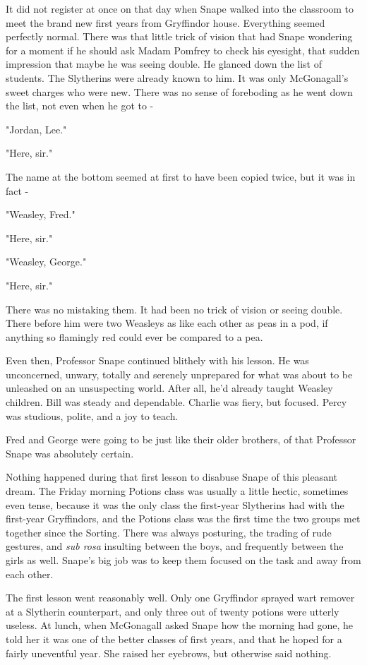 \documentclass[a4paper,11pt]{article}
\begin{document}
It did not register at once on that day when Snape walked into the classroom to meet the brand new first years from Gryffindor house. Everything seemed perfectly normal. There was that little trick of vision that had Snape wondering for a moment if he should ask Madam Pomfrey to check his eyesight, that sudden impression that maybe he was seeing double. He glanced down the list of students. The Slytherins were already known to him. It was only McGonagall's sweet charges who were new. There was no sense of foreboding as he went down the list, not even when he got to -

"Jordan, Lee."

"Here, sir."

The name at the bottom seemed at first to have been copied twice, but it was in fact -

"Weasley, Fred."

"Here, sir."

"Weasley, George."

"Here, sir."

There was no mistaking them. It had been no trick of vision or seeing double. There before him were two Weasleys as like each other as peas in a pod, if anything so flamingly red could ever be compared to a pea.

Even then, Professor Snape continued blithely with his lesson. He was unconcerned, unwary, totally and serenely unprepared for what was about to be unleashed on an unsuspecting world. After all, he'd already taught Weasley children. Bill was steady and dependable. Charlie was fiery, but focused. Percy was studious, polite, and a joy to teach.

Fred and George were going to be just like their older brothers, of that Professor Snape was absolutely certain.

Nothing happened during that first lesson to disabuse Snape of this pleasant dream. The Friday morning Potions class was usually a little hectic, sometimes even tense, because it was the only class the first-year Slytherins had with the first-year Gryffindors, and the Potions class was the first time the two groups met together since the Sorting. There was always posturing, the trading of rude gestures, and \emph{sub rosa} insulting between the boys, and frequently between the girls as well. Snape's big job was to keep them focused on the task and away from each other.

The first lesson went reasonably well. Only one Gryffindor sprayed wart remover at a Slytherin counterpart, and only three out of twenty potions were utterly useless. At lunch, when McGonagall asked Snape how the morning had gone, he told her it was one of the better classes of first years, and that he hoped for a fairly uneventful year. She raised her eyebrows, but otherwise said nothing.
\end{document}
